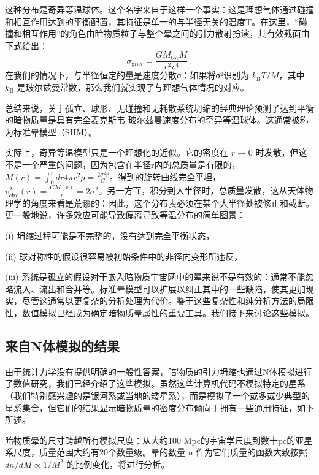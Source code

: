 这种分布是奇异等温球体。这个名字来自于这样一个事实：这是理想气体通过碰撞和相互作用达到的平衡配置，其特征是单一的与半径无关的温度T。在这里，“碰撞和相互作用”的角色由暗物质粒子与整个晕之间的引力散射扮演，其有效截面由下式给出：
\begin{equation}
\sigma_{\text{grav}} = \frac{G M_{\text{tot}} M}{r^2 v^4}~. 
\end{equation}
在我们的情况下，与半径恒定的量是速度分散σ：如果将σ²识别为 \( k_{\text{B}} T/M \)，其中 \( k_{\text{B}} \) 是玻尔兹曼常数，那么我们就实现了与理想气体情况的对应。

总结来说，关于孤立、球形、无碰撞和无耗散系统坍缩的经典理论预测了达到平衡的暗物质晕是具有完全麦克斯韦-玻尔兹曼速度分布的奇异等温球体。这通常被称为标准晕模型（SHM）。

实际上，奇异等温模型只是一个理想化的近似。它的密度在 \( r \to 0 \) 时发散，但这不是一个严重的问题，因为包含在半径r内的总质量是有限的，\( M(r) = \int_0^r dr 4\pi r^2 \rho = \frac{2\sigma^2 r}{G} \)。得到的旋转曲线完全平坦，\( v_{\text{circ}}^2(r) = \frac{G M(r)}{r} = 2\sigma^2 \)。另一方面，积分到大半径时，总质量发散，这从天体物理学的角度来看是荒谬的：因此，这个分布表必须在某个大半径处被修正和截断。更一般地说，许多效应可能导致偏离导致等温分布的简单图景：

(i) 坍缩过程可能是不完整的，没有达到完全平衡状态，

(ii) 球对称性的假设很容易被初始条件中的非径向变形所违反，

(iii) 系统是孤立的假设对于嵌入暗物质宇宙网中的晕来说不是有效的：通常不能忽略流入、流出和合并等。标准晕模型可以扩展以纠正其中的一些缺陷，使其更加现实，尽管这通常以更复杂的分析处理为代价。鉴于这些复杂性和纯分析方法的局限性，数值模拟已经成为确定暗物质晕属性的重要工具。我们接下来讨论这些模拟。

\subsection{来自N体模拟的结果}

由于统计力学没有提供明确的一般性答案，暗物质的引力坍缩也通过N体模拟进行了数值研究，我们已经介绍了这些模拟。虽然这些计算机代码不模拟特定的星系（我们特别感兴趣的是银河系或当地的矮星系），而是模拟了一个或多或少典型的星系集合，但它们的结果显示暗物质晕的密度分布倾向于拥有一些通用特征，如下所述。

暗物质晕的尺寸跨越所有模拟尺度：从大约100 Mpc的宇宙学尺度到数十pc的亚星系尺度，质量范围大约有20个数量级。晕的数量 n 作为它们质量的函数大致按照 \( dn/dM \propto 1/M^2 \) 的比例变化，将进行分析。

